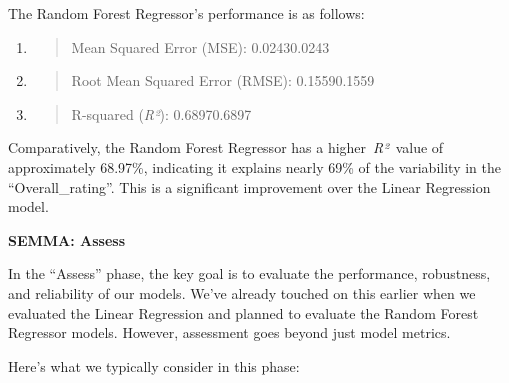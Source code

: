 \documentclass[
]{article}
\newcommand{\textcenter}[1]{\begin{center} \vspace{10px}\textbf{\large #1} \end{center}}
\begin{document}
The Random Forest Regressor's performance is as follows:

\begin{enumerate}
\def\labelenumi{\arabic{enumi}.}
\item
  \begin{quote}
  Mean Squared Error (MSE): 0.02430.0243
  \end{quote}
\item
  \begin{quote}
  Root Mean Squared Error (RMSE): 0.15590.1559
  \end{quote}
\item
  \begin{quote}
  R-squared (\emph{R²}): 0.68970.6897
  \end{quote}
\end{enumerate}

Comparatively, the Random Forest Regressor has a higher~\emph{R²}~value
of approximately 68.97\%, indicating it explains nearly 69\% of the
variability in the ``Overall\_rating''. This is a significant
improvement over the Linear Regression model.


\textcenter{SEMMA: Assess}

In the ``Assess'' phase, the key goal is to evaluate the performance,
robustness, and reliability of our models. We've already touched on this
earlier when we evaluated the Linear Regression and planned to evaluate
the Random Forest Regressor models. However, assessment goes beyond just
model metrics.

Here's what we typically consider in this phase:
\end{document}
